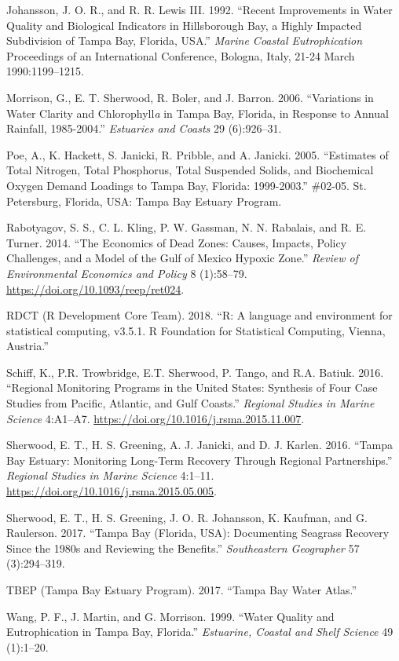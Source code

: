 \documentclass[]{article}
\begin{document}
\leavevmode\hypertarget{ref-Johansson92}{}%
Johansson, J. O. R., and R. R. Lewis III. 1992. ``Recent Improvements in
Water Quality and Biological Indicators in Hillsborough Bay, a Highly
Impacted Subdivision of Tampa Bay, Florida, USA.'' \emph{Marine Coastal
Eutrophication} Proceedings of an International Conference, Bologna,
Italy, 21-24 March 1990:1199--1215.

\leavevmode\hypertarget{ref-Morrison06}{}%
Morrison, G., E. T. Sherwood, R. Boler, and J. Barron. 2006.
``Variations in Water Clarity and Chlorophyll\emph{a} in Tampa Bay,
Florida, in Response to Annual Rainfall, 1985-2004.'' \emph{Estuaries
and Coasts} 29 (6):926--31.

\leavevmode\hypertarget{ref-Poe05}{}%
Poe, A., K. Hackett, S. Janicki, R. Pribble, and A. Janicki. 2005.
``Estimates of Total Nitrogen, Total Phosphorus, Total Suspended Solids,
and Biochemical Oxygen Demand Loadings to Tampa Bay, Florida:
1999-2003.'' \#02-05. St. Petersburg, Florida, USA: Tampa Bay Estuary
Program.

\leavevmode\hypertarget{ref-Rabotyagov14}{}%
Rabotyagov, S. S., C. L. Kling, P. W. Gassman, N. N. Rabalais, and R. E.
Turner. 2014. ``The Economics of Dead Zones: Causes, Impacts, Policy
Challenges, and a Model of the Gulf of Mexico Hypoxic Zone.''
\emph{Review of Environmental Economics and Policy} 8 (1):58--79.
\url{https://doi.org/10.1093/reep/ret024}.

\leavevmode\hypertarget{ref-RDCT18}{}%
RDCT (R Development Core Team). 2018. ``R: A language and environment
for statistical computing, v3.5.1. R Foundation for Statistical
Computing, Vienna, Austria.''

\leavevmode\hypertarget{ref-Schiff16}{}%
Schiff, K., P.R. Trowbridge, E.T. Sherwood, P. Tango, and R.A. Batiuk.
2016. ``Regional Monitoring Programs in the United States: Synthesis of
Four Case Studies from Pacific, Atlantic, and Gulf Coasts.''
\emph{Regional Studies in Marine Science} 4:A1--A7.
\url{https://doi.org/10.1016/j.rsma.2015.11.007}.

\leavevmode\hypertarget{ref-Sherwood16}{}%
Sherwood, E. T., H. S. Greening, A. J. Janicki, and D. J. Karlen. 2016.
``Tampa Bay Estuary: Monitoring Long-Term Recovery Through Regional
Partnerships.'' \emph{Regional Studies in Marine Science} 4:1--11.
\url{https://doi.org/10.1016/j.rsma.2015.05.005}.

\leavevmode\hypertarget{ref-Sherwood17}{}%
Sherwood, E. T., H. S. Greening, J. O. R. Johansson, K. Kaufman, and G.
Raulerson. 2017. ``Tampa Bay (Florida, USA): Documenting Seagrass
Recovery Since the 1980s and Reviewing the Benefits.''
\emph{Southeastern Geographer} 57 (3):294--319.

\leavevmode\hypertarget{ref-TBEP17}{}%
TBEP (Tampa Bay Estuary Program). 2017. ``Tampa Bay Water Atlas.''

\leavevmode\hypertarget{ref-Wang99}{}%
Wang, P. F., J. Martin, and G. Morrison. 1999. ``Water Quality and
Eutrophication in Tampa Bay, Florida.'' \emph{Estuarine, Coastal and
Shelf Science} 49 (1):1--20.
\end{document}
